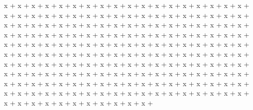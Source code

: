 x + x + x + x + x + x + x + x + x + x + x + x + x + x + x + x + x + x + x + x + x + x + x + x + x + x + x + x + x + x + x + x + x + x + x + x + x + x + x + x + x + x + x + x + x + x + x + x + x + x + x + x + x + x + x + x + x + x + x + x + x + x + x + x + x + x + x + x + x + x + x + x + x + x + x + x + x + x + x + x + x + x + x + x + x + x + x + x + x + x + x + x + x + x + x + x + x + x + x + x + x + x + x + x + x + x + x + x + x + x + x + x + x + x + x + x + x + x + x + x + x + x + x + x + x + x + x + x + x + x + x + x + x + x + x + x + x + x + x + x + x + x + x + x + x + x + x + x + x + x + x + x + x + x + x + x + x + x + x + x + x + x + x + x + x + x + x + x + x + x + x + x + x + x + x + x + x + x + x + x + x + x + x + x + x + x + x + x + x + x + x + 
